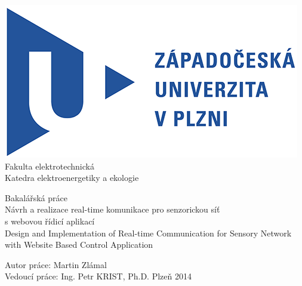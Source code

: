 \documentclass[oneside,12pt,a4paper,draft]{book} %
\begin{document}
\pagestyle{empty}
\begin{titlepage}
\noindent
\includegraphics[scale=1]{zcu.png} \\[0.3cm]
Fakulta elektrotechnická \\
Katedra elektroenergetiky a ekologie
\vspace{5cm}
\begin{center}
	{\Huge\sc Bakalářská práce} \\
	\vspace{1cm}
	{\large Návrh a realizace real-time komunikace pro senzorickou síť\\s webovou řídicí aplikací\\}
	\vspace{1cm}
	{\large Design and Implementation of Real-time Communication for Sensory Network with Website Based Control Application}
\end{center}
\vfill
Autor práce: Martin Zlámal\\
Vedoucí práce: Ing. Petr KRIST, Ph.D. \hfill Plzeň 2014
\end{titlepage}

\pagestyle{plain}





%

\tableofcontents
\cleardoublepage
{}
{}
\listoffigures
\end{document}
